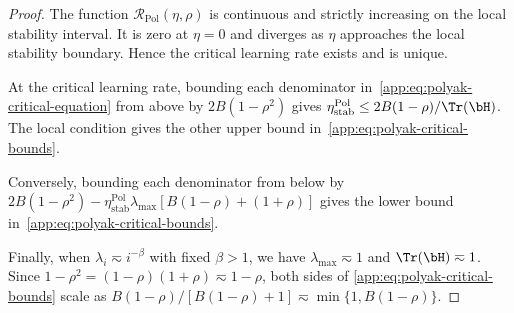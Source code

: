 \begin{proof}
The function \(\mathcal R_{\mathrm{Pol}}(\eta,\rho)\) is continuous and strictly increasing on the local stability interval. It is zero at \(\eta=0\) and diverges as \(\eta\) approaches the local stability boundary. Hence the critical learning rate exists and is unique.

At the critical learning rate, bounding each denominator in~\eqref{app:eq:polyak-critical-equation} from above by \(2B(1-\rho^2)\) gives
\(\eta_{\mathrm{stab}}^{\mathrm{Pol}}
\leq2B(1-\rho)/\Tr(\bH)\). The local condition gives the other upper bound in~\eqref{app:eq:polyak-critical-bounds}.

Conversely, bounding each denominator from below by
\(2B(1-\rho^2)
-\eta_{\mathrm{stab}}^{\mathrm{Pol}}\lambda_{\max}
[B(1-\rho)+(1+\rho)]\)
gives the lower bound in~\eqref{app:eq:polyak-critical-bounds}.

Finally, when \(\lambda_i\eqsim i^{-\beta}\) with fixed \(\beta>1\), we have
\(\lambda_{\max}\eqsim1\) and \(\Tr(\bH)\eqsim1\). Since
\(1-\rho^2=(1-\rho)(1+\rho)\eqsim1-\rho\), both sides of
\eqref{app:eq:polyak-critical-bounds} scale as
\(B(1-\rho)/[B(1-\rho)+1]\eqsim\min\{1,B(1-\rho)\}\).
\end{proof}



